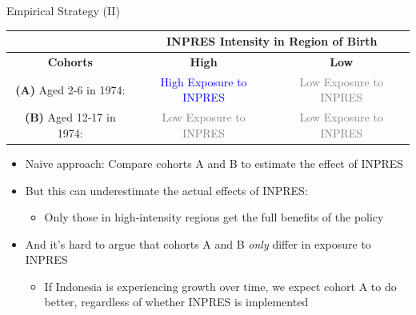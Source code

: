 \documentclass[11pt,notes=hide,aspectratio=169,mathserif]{beamer}
\begin{document}
\begin{frame}{Empirical Strategy (II)}
\begin{table}
\scriptsize
\centering
\begin{tabular}{|c|c|c|}
\hline
    & \multicolumn{2}{|c|}{\textbf{INPRES Intensity in Region of Birth}}  \\
    \hline
    \textbf{Cohorts} & \textbf{High} & \textbf{Low}  \\
\hline 
\textbf{(A)} Aged 2-6 in 1974:  & \rule{0pt}{15pt}  \textcolor{blue}{High Exposure to INPRES} & \rule{0pt}{15pt} \textcolor{gray}{Low Exposure to INPRES} \\
\hline
\textbf{(B)} Aged 12-17 in 1974:  & \rule{0pt}{15pt} \textcolor{gray}{Low Exposure to INPRES} & \rule{0pt}{15pt} \textcolor{gray}{Low Exposure to INPRES} \\
\hline
\end{tabular}
\end{table}

\begin{itemize}
     \item  Naive approach: Compare cohorts A and B to estimate the effect of INPRES
     \item  But this can underestimate the actual effects of INPRES:
     \begin{itemize}
        \item  Only those in high-intensity regions get the full benefits of the policy
    \end{itemize} 
     \item  And it's hard to argue that cohorts A and B \textit{only} differ in exposure to INPRES
     \begin{itemize}
        \item  If Indonesia is experiencing growth over time, we expect cohort A to do better, regardless of whether INPRES is implemented
    \end{itemize}
\end{itemize}
\end{frame}
\end{document}
